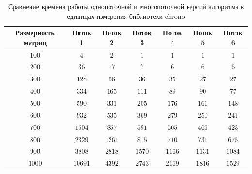 \documentclass[12pt, a4paper]{report}
\begin{document}
	\begin{table}[ht!]
		\caption{Сравнение времени работы однопоточной и многопоточной версий алгоритма в единицах измерения библиотеки chrono}
		\label{table1}
		\begin{center}
			\begin{tabular}{|c|c|c|c|c|c|c|}
				\hline
				\bf{Размерность матриц} & \bf{Поток 1} & \bf{Поток 2} & \bf{Поток 3} & \bf{Поток 4} &\bf{Поток 5} & \bf{Поток 6} \\\hline
				
				$100$ & $4$ & $2$ & $1$ & $1$ & $1$ & $1$ \\ \hline
				
				$200$ & $36$ & $17$ & $7$ & $6$ & $6$ & $6$\\\hline
				
				$300$ & $128$ & $56$ & $36$ & $35$ & $27$ & $27$\\\hline
				
				$400$ & $334$ & $165$ & $111$ & $89$ & $90$ & $77$\\\hline
				
				$500$ & $590$ & $331$ & $205$ & $176$ & $161$ & $148$\\\hline
				
				$600$ & $932$ & $535$ & $369$ & $279$ & $250$ & $241$\\\hline
				
				$700$ & $1504$ & $857$ & $591$ & $505$ & $465$ & $423$\\\hline
				
				$800$ & $2329$ & $1261$ & $815$ & $710$ & $731$ & $675$\\\hline
							
			    $900$ & $3808$ & $2818$ & $1570$ & $1166$ & $1131$ & $1084$ \\\hline
				
				$1000$ & $10691$ & $4392$ & $2743$ & $2169$ & $1816$ & $1529$\\\hline
			\end{tabular}
		\end{center}
	\end{table}

	\newpage
\end{document}
